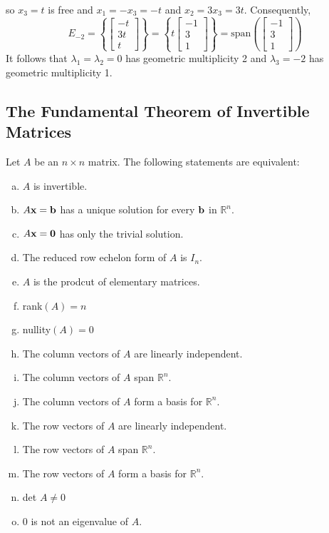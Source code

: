 so $x_3=t$ is free and $x_1=-x_3=-t$ and $x_2=3x_3=3t$. Consequently,
\[
    E_{-2}=\left\{\begin{bmatrix}
        -t \\3t\\t
    \end{bmatrix}\right\}=\left\{t\begin{bmatrix}
        -1 \\3\\1
    \end{bmatrix}\right\}=\text{span}\left(\begin{bmatrix}
            -1 \\3\\1
        \end{bmatrix}\right)
\]
It follows that $\lambda_1=\lambda_2=0$ has geometric multiplicity 2 and $\lambda_3=-2$
has geometric multiplicity 1.

\subsection*{The Fundamental Theorem of Invertible Matrices}
Let $A$ be an $n\times n$ matrix. The following statements are equivalent:
\begin{enumerate}[(a)]
    \item $A$ is invertible.
    \item $A\mathbf{x}=\mathbf{b}$ has a unique solution for every $\mathbf{b}$ in $\mathbb{R}^n$.
    \item $A\mathbf{x}=\mathbf{0}$ has only the trivial solution.
    \item The reduced row echelon form of $A$ is $I_n$.
    \item $A$ is the prodcut of elementary matrices.
    \item rank$(A)=n$
    \item nullity$(A)=0$
    \item The column vectors of $A$ are linearly independent.
    \item The column vectors of $A$ span $\mathbb{R}^n$.
    \item The column vectors of $A$ form a basis for $\mathbb{R}^n$.
    \item The row vectors of $A$ are linearly independent.
    \item The row vectors of $A$ span $\mathbb{R}^n$.
    \item The row vectors of $A$ form a basis for $\mathbb{R}^n$.
    \item det $A\neq0$
    \item 0 is not an eigenvalue of $A$.
\end{enumerate}


